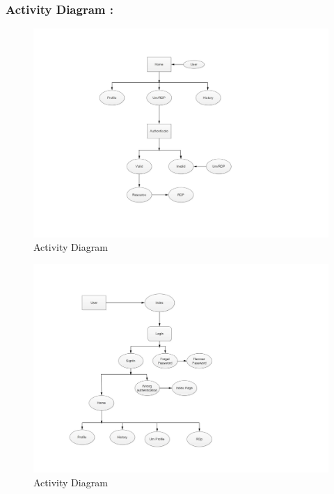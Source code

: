 \documentclass[12pt,a4paper,final,oneside]{report}
\begin{document}
	\subsubsection{Activity Diagram :}
\begin{figure}
	\centering	\includegraphics[width=1.3\linewidth,angle=0]
		{activity1.jpg}
		\caption{Activity Diagram}
		\newpage
	\end{figure}
	\begin{figure}
		\centering	\includegraphics[width=1.5\linewidth,angle=0]
		{activity2.jpg}
		\caption{Activity Diagram}
	\end{figure}
	\newpage
\end{document}
